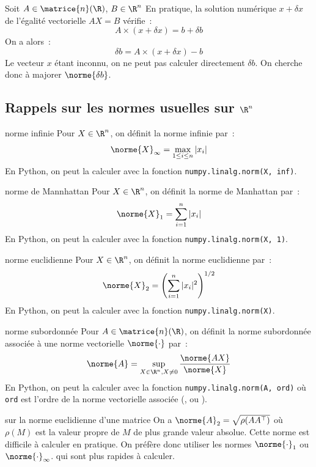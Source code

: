 Soit $A \in \matrice{n}(\R)$, $B \in \R^n$
En pratique, la solution numérique $x + \delta x$ de l'égalité vectorielle $AX = B$ vérifie~:
$$A\times(x+\delta x) = b + \delta b$$
On a alors~:
$$\delta b = A\times(x + \delta x) - b$$
Le vecteur $x$ étant inconnu, on ne peut pas calculer directement $\delta b$. On cherche donc à majorer $\norme{\delta b}$.\\\par

\subsection{Rappels sur les normes usuelles sur $\R^n$}

\begin{definition}{}{norme infinie}
    Pour $X \in \R^n$, on définit la norme infinie par~:
    $$\norme{X}_\infty = \max_{1 \leq i \leq n} |x_i|$$
    En Python, on peut la calculer avec la fonction \texttt{numpy.linalg.norm(X, inf)}.
\end{definition}

\begin{definition}{}{norme de Mannhattan}
    Pour $X \in \R^n$, on définit la norme de Manhattan par~:
    $$\norme{X}_1 = \sum_{i=1}^n |x_i|$$
    En Python, on peut la calculer avec la fonction \texttt{numpy.linalg.norm(X, 1)}.
\end{definition}

\begin{definition}{}{norme euclidienne}
    Pour $X \in \R^n$, on définit la norme euclidienne par~:
    $$\norme{X}_2 = \left(\sum_{i=1}^n |x_i|^2\right)^{1/2}$$
    En Python, on peut la calculer avec la fonction \texttt{numpy.linalg.norm(X)}.
\end{definition}

\begin{definition}{}{norme subordonnée}
    Pour $A \in \matrice{n}(\R)$, on définit la norme subordonnée associée à une norme vectorielle $\norme{\cdot}$ par~:
    $$\norme{A} = \sup_{X \in \R^n, X \neq 0} \frac{\norme{AX}}{\norme{X}}$$
    En Python, on peut la calculer avec la fonction \texttt{numpy.linalg.norm(A, ord)} où \texttt{ord} est l'ordre de la norme vectorielle associée (,  ou ).
    
\end{definition}


\begin{remarque}{}{sur la norme euclidienne d'une matrice}
    On a $\norme{A}_2 = \sqrt{\rho(AA^\top)}$ où $\rho(M)$ est la valeur propre de $M$ de plus grande valeur absolue.
    Cette norme est difficile à calculer en pratique. On préfère donc utiliser les normes $\norme{\cdot}_1$ ou $\norme{\cdot}_\infty$. qui sont plus rapides à calculer.
    
\end{remarque}

